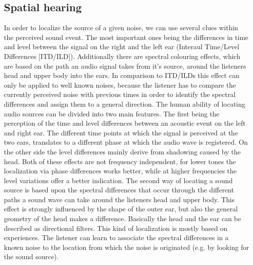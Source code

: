 \documentclass[a4paper,11pt]{article}%
\renewcommand{\\}{\vspace*{0.5\baselineskip} \newline}
\begin{document}
\subsection{Spatial hearing}
In order to localize the source of a given noise, we can use several clues within the perceived sound event. The most important ones being the differences in time and level between the signal on the right and the left ear (Interaul Time/Level Differences [ITD/ILD]). Additionally there are spectral colouring effects, which are based on the path an audio signal takes from it's source, around the listeners head and upper body into the ears. In comparison to ITD/ILDs this effect can only be applied to well known noises, because the listener has to compare the currently perceived noise with previous times in order to identify the spectral differences and assign them to a general direction.   
\newline
\newline
The human ability of locating audio sources can be divided into two main features. The first being the perception of the time and level differences between an acoustic event on the left and right ear. The different time points at which the signal is perceived at the two ears, translates to a different phase at which the audio wave is registered. On the other side the level differences mainly derive from shadowing caused by the head. Both of these effects are not frequency independent, for lower tones the localization via phase differences works better, while at higher frequencies the level variations offer a better indication.
\newline
\newline
The second way of locating a sound source is based upon the spectral differences that occur through the different paths a sound wave can take around the listeners head and upper body. This effect is strongly influenced by the shape of the outer ear, but also the general geometry of the head makes a difference. Basically the head and the ear can be described as directional filters. This kind of localization is mostly based on experiences. The listener can learn to associate the spectral differences in a known noise to the location from which the noise is originated (e.g. by looking for the sound source).
\end{document}
